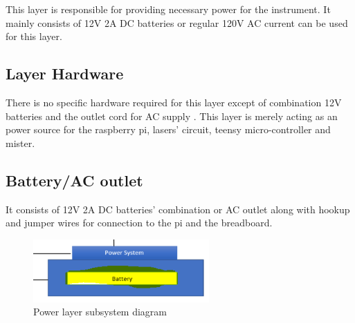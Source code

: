 This layer is responsible for providing necessary power for the instrument. It mainly consists of 12V 2A DC batteries or regular 120V AC current can be used for this layer.
\subsection{Layer Hardware}
There is no specific hardware required for this layer except of combination 12V batteries and the outlet cord for AC supply . This layer is merely acting as an power source for the raspberry pi, lasers' circuit, teensy micro-controller and mister. 


\subsection{Battery/AC outlet}
It consists of 12V 2A DC batteries' combination or AC outlet along with hookup and jumper wires for connection to the pi and the breadboard.

\begin{figure}[h!]
	\centering
 	\includegraphics[width=0.60\textwidth]{images/Capture.png}
 \caption{Power layer subsystem diagram}
\end{figure}



